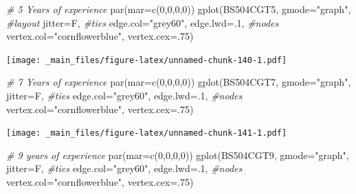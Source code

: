 \documentclass[
  notitlepage,
  onecolumn,
  openany]{book}
\newenvironment{Shaded}{\begin{snugshade}}{\end{snugshade}}
\newcommand{\AttributeTok}[1]{\textcolor[rgb]{0.77,0.63,0.00}{#1}}
\newcommand{\CommentTok}[1]{\textcolor[rgb]{0.56,0.35,0.01}{\textit{#1}}}
\newcommand{\DecValTok}[1]{\textcolor[rgb]{0.00,0.00,0.81}{#1}}
\newcommand{\FunctionTok}[1]{\textcolor[rgb]{0.00,0.00,0.00}{#1}}
\newcommand{\NormalTok}[1]{#1}
\newcommand{\StringTok}[1]{\textcolor[rgb]{0.31,0.60,0.02}{#1}}
\begin{document}
\begin{Shaded}
\begin{Highlighting}[]
\CommentTok{\# 5 Years of experience}
\FunctionTok{par}\NormalTok{(}\AttributeTok{mar=}\FunctionTok{c}\NormalTok{(}\DecValTok{0}\NormalTok{,}\DecValTok{0}\NormalTok{,}\DecValTok{0}\NormalTok{,}\DecValTok{0}\NormalTok{))}
\FunctionTok{gplot}\NormalTok{(BS504CGT5,}
      \AttributeTok{gmode=}\StringTok{"graph"}\NormalTok{,}
      \CommentTok{\#layout}
      \AttributeTok{jitter=}\NormalTok{F,}
      \CommentTok{\#ties}
      \AttributeTok{edge.col=}\StringTok{"grey60"}\NormalTok{, }
      \AttributeTok{edge.lwd=}\NormalTok{.}\DecValTok{1}\NormalTok{,}
      \CommentTok{\#nodes}
      \AttributeTok{vertex.col=}\StringTok{"cornflowerblue"}\NormalTok{,}
      \AttributeTok{vertex.cex=}\NormalTok{.}\DecValTok{75}\NormalTok{)}
\end{Highlighting}
\end{Shaded}

\texttt{[image: \_main\_files/figure-latex/unnamed-chunk-140-1.pdf]}

\begin{Shaded}
\begin{Highlighting}[]
\CommentTok{\# 7 Years of experience}
\FunctionTok{par}\NormalTok{(}\AttributeTok{mar=}\FunctionTok{c}\NormalTok{(}\DecValTok{0}\NormalTok{,}\DecValTok{0}\NormalTok{,}\DecValTok{0}\NormalTok{,}\DecValTok{0}\NormalTok{))}
\FunctionTok{gplot}\NormalTok{(BS504CGT7,}
      \AttributeTok{gmode=}\StringTok{"graph"}\NormalTok{,}
      \AttributeTok{jitter=}\NormalTok{F,}
      \CommentTok{\#ties}
      \AttributeTok{edge.col=}\StringTok{"grey60"}\NormalTok{, }
      \AttributeTok{edge.lwd=}\NormalTok{.}\DecValTok{1}\NormalTok{,}
      \CommentTok{\#nodes}
      \AttributeTok{vertex.col=}\StringTok{"cornflowerblue"}\NormalTok{,}
      \AttributeTok{vertex.cex=}\NormalTok{.}\DecValTok{75}\NormalTok{)}
\end{Highlighting}
\end{Shaded}

\texttt{[image: \_main\_files/figure-latex/unnamed-chunk-141-1.pdf]}

\begin{Shaded}
\begin{Highlighting}[]
\CommentTok{\# 9 years of experience}
\FunctionTok{par}\NormalTok{(}\AttributeTok{mar=}\FunctionTok{c}\NormalTok{(}\DecValTok{0}\NormalTok{,}\DecValTok{0}\NormalTok{,}\DecValTok{0}\NormalTok{,}\DecValTok{0}\NormalTok{))}
\FunctionTok{gplot}\NormalTok{(BS504CGT9,}
      \AttributeTok{gmode=}\StringTok{"graph"}\NormalTok{,}
      \AttributeTok{jitter=}\NormalTok{F,}
      \CommentTok{\#ties}
      \AttributeTok{edge.col=}\StringTok{"grey60"}\NormalTok{, }
      \AttributeTok{edge.lwd=}\NormalTok{.}\DecValTok{1}\NormalTok{,}
      \CommentTok{\#nodes}
      \AttributeTok{vertex.col=}\StringTok{"cornflowerblue"}\NormalTok{,}
      \AttributeTok{vertex.cex=}\NormalTok{.}\DecValTok{75}\NormalTok{)}
\end{Highlighting}
\end{Shaded}
\end{document}
